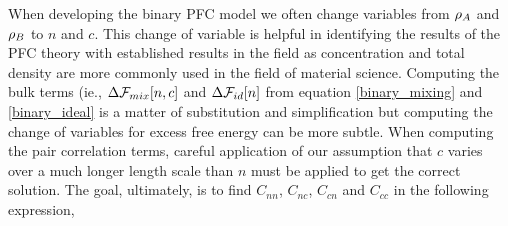 \label{appendix:binary_corr}

When developing the binary PFC model we often change variables from $\rho_A$ and
$\rho_B$ to $n$ and $c$.  This change of variable is helpful in identifying the
results of the PFC theory with established results in the field as
concentration and total density are more commonly used in the field of material
science. Computing the bulk terms (ie., $\Delta\mathcal{F}_{mix}[n, c]$ and
$\Delta\mathcal{F}_{id}[n]$ from equation \ref{binary_mixing} and \ref{binary_ideal} is
a matter of substitution and simplification but computing the change of variables for excess free
energy can be more subtle. When computing the pair correlation
terms, careful application of our assumption that $c$ varies over a much longer
length scale than $n$ must be applied to get the correct solution. The goal,
ultimately, is to find $C_{n n}$, $C_{n c}$, $C_{c n}$ and $C_{c c}$ in the
following expression, 

